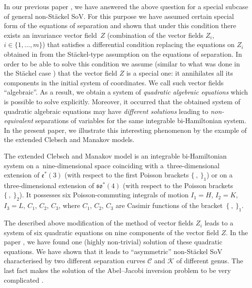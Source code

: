 \documentclass[10pt,a4paper]{amsart}
\numberwithin{equation}{section}
\begin{document}
In our previous paper \cite{SkrAsSoVExCle}, we have answered the above question for a special subcase of general non-St\"ackel SoV.
For this purpose we have assumed certain special form of the equations of separation
and shown
that under this condition there exists an invariance vector field~$Z$ (combination of the vector fields $Z_i$, $i\in \{1,\dots, m\}$)
 that satisfies a differential condition replacing the equations on $Z_i$ obtained in \cite{MFP,FP,FP2} from the St\"ackel-type assumption on the equations of separation.
In order to be able to solve this condition we assume (similar to what was done in the St\"ackel case \cite{MagSkr, SkrJGP2019, SkrSto, SkrBD}) that the vector field $Z$ is a special one: it annihilates all its components in the initial system of coordinates. We call such vector fields ``algebraic''. As a result, we obtain a system of {\it quadratic algebraic equations} which is possible to solve explicitly. Moreover, it occurred that the obtained system of quadratic algebraic equations may have {\it different solutions} leading to {\it non-equivalent} separations of variables for the same integrable bi-Hamiltonian system. In the present paper, we illustrate this interesting phenomenon by the example of the extended Clebsch and Manakov models.

The extended Clebsch and Manakov model is an integrable
 bi-Hamiltonian system on a~nine-dimensional space coinciding with a~three-dimensional extension of $\mathfrak{e}^*(3)$ (with respect to the first Poisson brackets $\{\ ,\ \}_1$) or on a three-dimensional extension of $\mathfrak{so}^*(4)$ (with respect to the Poisson brackets $\{\ ,\ \}_2$). It possesses six Poisson-commuting integrals of motion $I_1=H$, $I_2=K$, $I_3=L$, $C_1$, $C_2$, $C_3$, where $C_1$, $C_2$, $C_3$ are Casimir functions of the bracket~$\{\ ,\ \}_1$.

 The described above modification of the method of vector fields $Z_i$ leads to a system of six quadratic equations on nine components of the vector field $Z$. In the paper \cite{SkrAsSoVExCle}, we have found one (highly non-trivial) solution of these quadratic equations. We have shown that it leads to ``asymmetric'' non-St\"ackel SoV characterised by two different separation curves $\mathcal{C}$ and $\mathcal{K}$ of different genus. The last fact makes the solution of the Abel--Jacobi inversion problem to be very complicated \cite{FedMagSkr2}.
\end{document}
